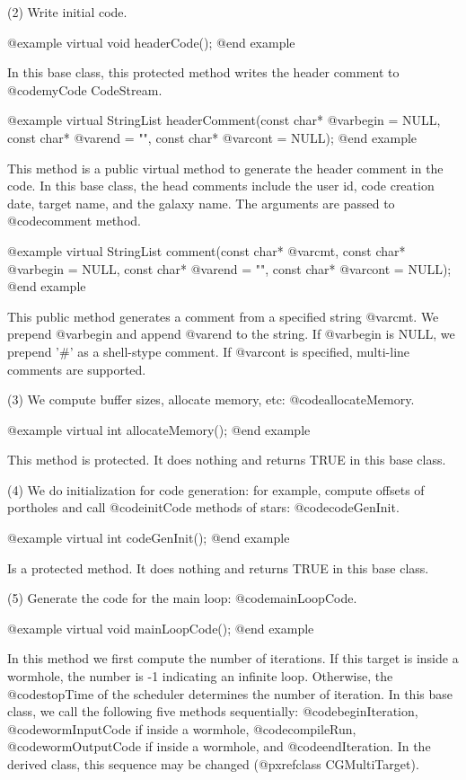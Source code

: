 (2) Write initial code.

@example
virtual void headerCode();
@end example

In this base class, this protected method writes the  header comment 
to @code{myCode} CodeStream.

@example
virtual StringList headerComment(const char* @var{begin} = NULL, const char* @var{end} = "", const char* @var{cont} = NULL);
@end example

This method is a public virtual method to generate the header comment in
the code. In this base class, the head comments include the user id,
code creation date, target name, and the galaxy name. The arguments are
passed to @code{comment} method.

@example
virtual StringList comment(const char* @var{cmt}, const char* @var{begin} = NULL, const char* @var{end} = "", const char* @var{cont} = NULL);
@end example

This public method generates a comment from a specified string @var{cmt}.
We prepend @var{begin} and append @var{end} to the string. If @var{begin}
is NULL, we prepend '#' as a shell-stype comment. If @var{cont} is
specified, multi-line comments are supported.

(3) We compute buffer sizes, allocate memory, etc: @code{allocateMemory}.

@example
virtual int allocateMemory();
@end example

This method is protected. It does nothing and returns TRUE in this base class.

(4) We do initialization for code generation: for example, compute offsets
of portholes and call @code{initCode} methods of stars: @code{codeGenInit}.

@example
virtual int codeGenInit();
@end example

Is a protected method. It does nothing and returns TRUE in this base class.

(5) Generate the code for the main loop: @code{mainLoopCode}.

@example
virtual void mainLoopCode();
@end example

In this method we first compute the number of iterations. If this target
is inside a wormhole, the number is -1 indicating an infinite loop. Otherwise,
the @code{stopTime} of the scheduler determines the number of iteration.
In this base class, we call the following five methods sequentially:
@code{beginIteration}, @code{wormInputCode} if inside a wormhole,
@code{compileRun}, @code{wormOutputCode} if inside a wormhole, and
@code{endIteration}. In the derived class, this sequence may be changed
(@pxref{class CGMultiTarget}).

